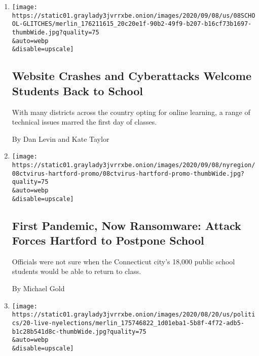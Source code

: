 \begin{enumerate}
\def\labelenumi{\arabic{enumi}.}
\item
  \href{/2020/09/08/us/school-districts-cyberattacks-glitches.html}{}

  \texttt{[image: https://static01.graylady3jvrrxbe.onion/images/2020/09/08/us/08SCHOOL-GLITCHES/merlin\_176211615\_20c20e1f-90b2-49f9-b207-b16cf73b1697-thumbWide.jpg?quality=75\\\&auto=webp\\\&disable=upscale]}

  \hypertarget{website-crashes-and-cyberattacks-welcome-students-back-to-school}{%
  \subsection{Website Crashes and Cyberattacks Welcome Students Back to
  School}\label{website-crashes-and-cyberattacks-welcome-students-back-to-school}}

  With many districts across the country opting for online learning, a
  range of technical issues marred the first day of classes.

  By Dan Levin and Kate Taylor
\item
  \href{/2020/09/08/nyregion/hartford-schools-ransomware.html}{}

  \texttt{[image: https://static01.graylady3jvrrxbe.onion/images/2020/09/08/nyregion/08ctvirus-hartford-promo/08ctvirus-hartford-promo-thumbWide.jpg?quality=75\\\&auto=webp\\\&disable=upscale]}

  \hypertarget{first-pandemic-now-ransomware-attack-forces-hartford-to-postpone-school}{%
  \subsection{First Pandemic, Now Ransomware: Attack Forces Hartford to
  Postpone
  School}\label{first-pandemic-now-ransomware-attack-forces-hartford-to-postpone-school}}

  Officials were not sure when the Connecticut city's 18,000 public
  school students would be able to return to class.

  By Michael Gold
\item
  \href{/2020/08/20/us/elections/new-york-expands-mail-in-voting-amid-virus-fears.html}{}

  \texttt{[image: https://static01.graylady3jvrrxbe.onion/images/2020/08/20/us/politics/20-live-nyelections/merlin\_175746822\_1d01eba1-5b8f-4f72-adb5-b1c28b541d8c-thumbWide.jpg?quality=75\\\&auto=webp\\\&disable=upscale]}

  \hypertarget{new-york-expands-mail-in-voting-amid-virus-fears}{%
}
\end{enumerate}
